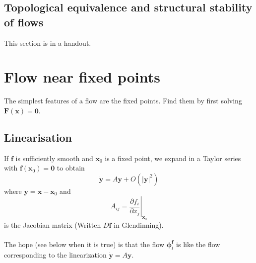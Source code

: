 \documentclass{article}
\newcommand{\bp}{\bm{\phi}}                                 %
\begin{document}
\subsection{Topological equivalence and structural stability of flows}
This section is in a handout.
\\
\section{Flow near fixed points}
The simplest features of a flow are the fixed points. Find them by first 
solving $\bm{F}(\bm{x}) = \bm{0}$.
\\
\subsection{Linearisation}
If $\bm{f}$ is sufficiently smooth and $\bm{x}_0$ is a fixed point, we expand
in a Taylor series with $\bm{f}(\bm{x}_0)=\bm{0}$ to obtain 
\[\dot{\bm{y}} = A\bm{y} + O(|\bm{y}|^2)\]
 where $\bm{y} = \bm{x} - \bm{x}_0$ and
\[ A_{ij} = \left. \frac{\partial f_i}{\partial x_j}\right| _{\bm{x}_0}\]
is the Jacobian matrix (Written $D\bm{f}$ in Glendinning).
\\
\\
The hope (see below when it is true) is that the flow $\bp_t^{\bm{f}}$ is
like the flow corresponding to the linearization $\dot{\bm{y}} = A \bm{y}$.
\\
\end{document}
